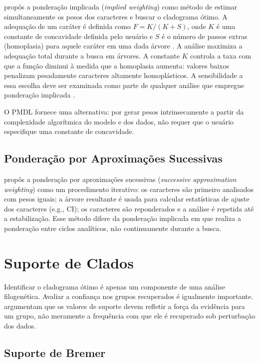 \textcite{goloboff1993b} propôs a ponderação implicada (\textit{implied weighting}) como método de estimar simultaneamente os pesos dos caracteres e buscar o cladograma ótimo. A adequação de um caráter é definida como $F = K / (K + S)$, onde $K$ é uma constante de concavidade definida pelo usuário e $S$ é o número de passos extras (homoplasia) para aquele caráter em uma dada árvore \parencite{wheeleretal2006}. A análise maximiza a adequação total durante a busca em árvores. A constante $K$ controla a taxa com que a função diminui à medida que a homoplasia aumenta: valores baixos penalizam pesadamente caracteres altamente homoplásticos. A sensibilidade a essa escolha deve ser examinada como parte de qualquer análise que empregue ponderação implicada \parencite{goloboff1993b,goloboff2013}.

O PMDL \parencite{wheelervaron2025} fornece uma alternativa: por gerar pesos intrinsecamente a partir da complexidade algorítmica do modelo e dos dados, não requer que o usuário especifique uma constante de concavidade.

\subsection{Ponderação por Aproximações Sucessivas}

\textcite{farris1969} propôs a ponderação por aproximações sucessivas (\textit{successive approximation weighting}) como um procedimento iterativo: os caracteres são primeiro analisados com pesos iguais; a árvore resultante é usada para calcular estatísticas de ajuste dos caracteres (e.g., CI); os caracteres são reponderados e a análise é repetida até a estabilização. Esse método difere da ponderação implicada em que realiza a ponderação entre ciclos analíticos, não continuamente durante a busca.

\section{Suporte de Clados}
\label{sec:suporte}

Identificar o cladograma ótimo é apenas um componente de uma análise filogenética. Avaliar a confiança nos grupos recuperados é igualmente importante. \textcite{grantkluge2008} argumentam que os valores de suporte devem refletir a força da evidência para um grupo, não meramente a frequência com que ele é recuperado sob perturbação dos dados.

\subsection{Suporte de Bremer}

